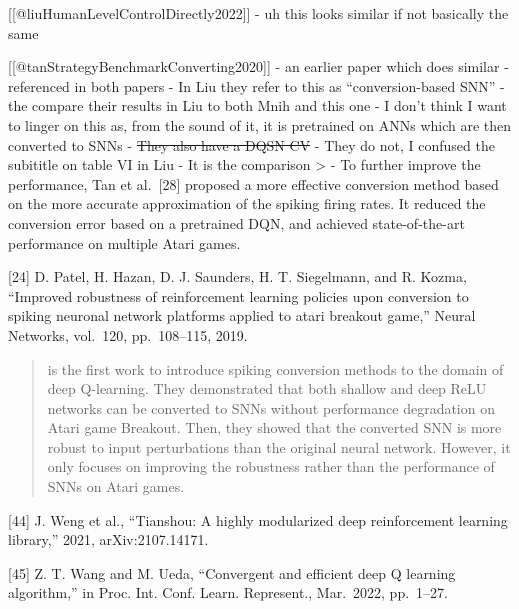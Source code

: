 {[}{[}@liuHumanLevelControlDirectly2022{]}{]} - uh this looks similar if
not basically the same

{[}{[}@tanStrategyBenchmarkConverting2020{]}{]} - an earlier paper which
does similar - referenced in both papers - In Liu they refer to this as
``conversion-based SNN'' - the compare their results in Liu to both Mnih
and this one - I don't think I want to linger on this as, from the sound
of it, it is pretrained on ANNs which are then converted to SNNs -
\st{They also have a DQSN CV} - They do not, I confused the subititle on
table VI in Liu - It is the comparison \textgreater{} - To further
improve the performance, Tan et al.~{[}28{]} proposed a more effective
conversion method based on the more accurate approximation of the
spiking firing rates. It reduced the conversion error based on a
pretrained DQN, and achieved state-of-the-art performance on multiple
Atari games.

{[}24{]} D. Patel, H. Hazan, D. J. Saunders, H. T. Siegelmann, and R.
Kozma, ``Improved robustness of reinforcement learning policies upon
conversion to spiking neuronal network platforms applied to atari
breakout game,'' Neural Networks, vol.~120, pp.~108--115, 2019.

\begin{quote}
is the first work to introduce spiking conversion methods to the domain
of deep Q-learning. They demonstrated that both shallow and deep ReLU
networks can be converted to SNNs without performance degradation on
Atari game Breakout. Then, they showed that the converted SNN is more
robust to input perturbations than the original neural network. However,
it only focuses on improving the robustness rather than the performance
of SNNs on Atari games.
\end{quote}

{[}44{]} J. Weng et al., ``Tianshou: A highly modularized deep
reinforcement learning library,'' 2021, arXiv:2107.14171.

{[}45{]} Z. T. Wang and M. Ueda, ``Convergent and efficient deep Q
learning algorithm,'' in Proc. Int. Conf. Learn. Represent., Mar.~2022,
pp.~1--27.
